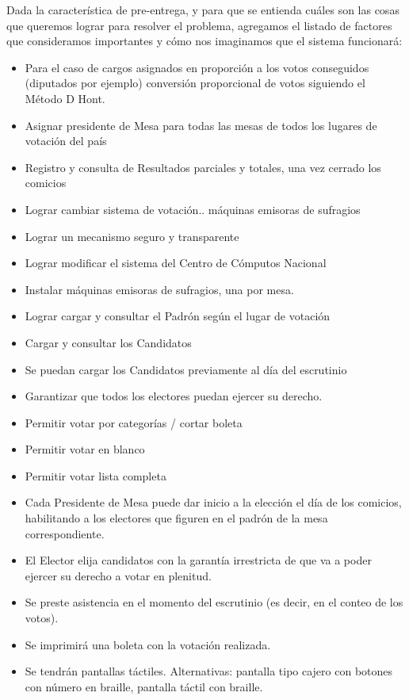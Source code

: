 \documentclass[spanish, 10pt,a4paper]{article}
\numberwithin{equation}{section} %
\begin{document}
Dada la característica de pre-entrega, y para que se entienda cuáles son las cosas que queremos lograr para resolver el problema, agregamos el listado de factores que consideramos importantes y cómo nos imaginamos que el sistema funcionará: 

\begin{itemize}
\item Para el caso de cargos asignados en proporción a los votos conseguidos (diputados por ejemplo) conversión proporcional de votos siguiendo el Método D Hont.
\item Asignar presidente de Mesa para todas las mesas de todos los lugares de votación del país
\item Registro y consulta de Resultados parciales y totales, una vez cerrado los comicios
\item Lograr cambiar sistema de votación.. máquinas emisoras de sufragios
\item Lograr un mecanismo seguro y transparente
\item Lograr modificar el sistema del Centro de Cómputos Nacional
\item Instalar máquinas emisoras de sufragios, una por mesa.
\item Lograr cargar y consultar el Padrón según el lugar de votación
\item Cargar y consultar los Candidatos
\item Se puedan cargar los Candidatos previamente al día del escrutinio
\item Garantizar que todos los electores puedan ejercer su derecho.
\item Permitir votar por categorías  / cortar boleta
\item Permitir votar en blanco
\item Permitir votar lista completa
\item Cada Presidente de Mesa puede dar inicio a la elección el día de los comicios, habilitando a los electores que figuren en el padrón de la mesa correspondiente.
\item El Elector elija candidatos con la garantía irrestricta de que va a poder ejercer su derecho a votar en plenitud.
\item Se preste asistencia en el momento del escrutinio (es decir, en el conteo de los votos).
\item Se imprimirá una boleta con la votación realizada.
\item Se tendrán pantallas táctiles. Alternativas: pantalla tipo cajero con botones con número en braille, pantalla táctil con braille.

\end{itemize}
\end{document}
